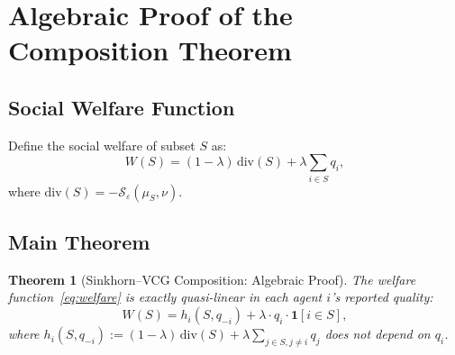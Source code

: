 \documentclass[10pt]{article}
\newtheorem{theorem}{Theorem}
\begin{document}
\section{Algebraic Proof of the Composition Theorem}
\label{sec:proof}

\subsection{Social Welfare Function}

Define the social welfare of subset $S$ as:
\begin{equation}
W(S) = (1-\lambda)\, \mathrm{div}(S) + \lambda \sum_{i \in S} q_i,
\label{eq:welfare}
\end{equation}
where $\mathrm{div}(S) = -\mathcal{S}_\varepsilon(\mu_S, \nu)$.

\subsection{Main Theorem}

\begin{theorem}[Sinkhorn--VCG Composition: Algebraic Proof]
\label{thm:composition}
The welfare function~\eqref{eq:welfare} is exactly quasi-linear in each agent $i$'s reported quality:
\[
W(S) = h_i(S, q_{-i}) + \lambda \cdot q_i \cdot \mathbf{1}[i \in S],
\]
where $h_i(S, q_{-i}) := (1-\lambda)\,\mathrm{div}(S) + \lambda \sum_{j \in S, j \neq i} q_j$ does not depend on $q_i$.
\end{theorem}
\end{document}
